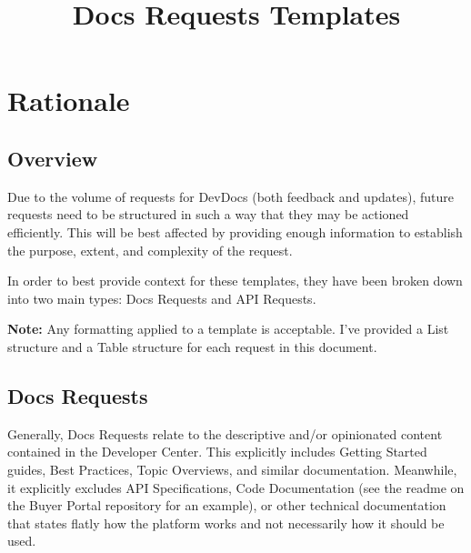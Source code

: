 \documentclass[a4paper]{article}
\title{Docs Requests Templates}
\author{}
\date{}
\begin{document}
\maketitle
\section*{Rationale}
\subsection*{Overview}
Due to the volume of requests for DevDocs (both feedback and updates), future requests need to be structured in such a way that they may be actioned efficiently. This will be best affected by providing enough information to establish the purpose, extent, and complexity of the request.

In order to best provide context for these templates, they have been broken down into two main types: Docs Requests and API Requests.

\textbf{Note:} Any formatting applied to a template is acceptable. I've provided a List structure and a Table structure for each request in this document.

\subsection*{Docs Requests}
Generally, Docs Requests relate to the descriptive and/or opinionated content contained in the Developer Center. This explicitly includes Getting Started guides, Best Practices, Topic Overviews, and similar documentation. Meanwhile, it explicitly excludes API Specifications, Code Documentation (see the readme on the Buyer Portal repository for an example), or other technical documentation that states flatly how the platform works and not necessarily how it should be used.
\end{document}
